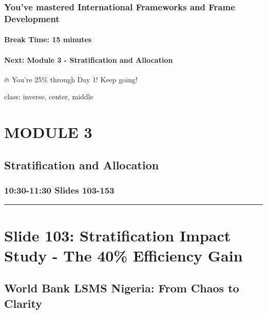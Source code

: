 \documentclass[
]{article}
\begin{document}
\subsubsection{You've mastered International Frameworks and Frame
Development}\label{youve-mastered-international-frameworks-and-frame-development}

\paragraph{Break Time: 15 minutes}\label{break-time-15-minutes}

\paragraph{Next: Module 3 - Stratification and
Allocation}\label{next-module-3---stratification-and-allocation}

🔥 You're 25\% through Day 1! Keep going!

class: inverse, center, middle

\section{MODULE 3}\label{module-3}

\subsection{Stratification and
Allocation}\label{stratification-and-allocation}

\subsubsection{10:30-11:30 \textbar{} Slides
103-153}\label{slides-103-153}

\begin{center}\rule{0.5\linewidth}{0.5pt}\end{center}

\section{Slide 103: Stratification Impact Study - The 40\% Efficiency
Gain}\label{slide-103-stratification-impact-study---the-40-efficiency-gain}

\subsection{World Bank LSMS Nigeria: From Chaos to
Clarity}\label{world-bank-lsms-nigeria-from-chaos-to-clarity}
\end{document}
